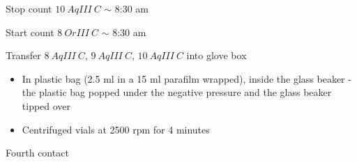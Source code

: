 \documentclass[idxtotoc,hyperref,openany,oneside]{labbook} %
\newcommand{\cmark}{\ding{51}}%
\newcommand{\done}{\rlap{$\square$}{\raisebox{2pt}{\large\hspace{1pt}\cmark}}%
  \hspace{-2.5pt}}
\begin{document}



\begin{todolist}
\item[\done]{Stop count $\boxed{10\ AqIII\ C}$ $\sim$ 8:30 am}
\item[\done]{Start count $\boxed{8\ OrIII\ C}$ $\sim$ 8:30 am}
\item[\done]{Transfer $\boxed{8\ AqIII\ C}$, $\boxed{9\ AqIII\ C}$,
  $\boxed{10\ AqIII\ C}$ into glove box}
  \begin{itemize}
  \item{In plastic bag (2.5 ml in a 15 ml parafilm wrapped),
    inside the glass beaker - the plastic bag popped
    under the negative pressure and the glass beaker tipped over}
  \item{Centrifuged vials at 2500 rpm for 4 minutes}
  \end{itemize}
\end{todolist}

Fourth contact
\end{document}
